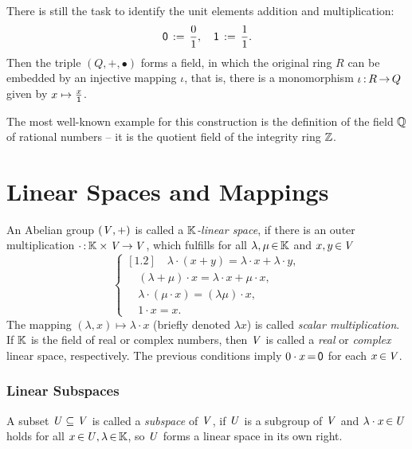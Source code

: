 \documentclass[11pt,twoside]{article}
\begin{document}
\subparagraph{}
There is still the task to identify the unit elements {\wrt}
addition and multiplication:
\[
{\mathsf{0}} \,:=\, \frac{0}{1},
\quad
{\mathsf{1}} \,:=\, \frac{1}{1}.
\]
Then the triple $(Q,+,\bullet)$ forms a field,
in which the original ring $R$ can be embedded by an injective mapping $\iota$,
that is,
there is a monomorphism $\iota {\,:\,} R {\,\to\,} Q$ given by $x \mapsto \frac{x}{{\mathsf{1}}}$.

\subparagraph{}
The most well-known example for this construction is the definition
of the field ${\mathbb{Q}}$ of rational numbers --
it is the quotient field of the integrity ring ${\mathbb{Z}}$.

\part{Linear Spaces and Mappings}                                              %
An Abelian group $(\mathit{V},+)$ is called a \textit{${\mathbb{K}}$-linear space},
if there is an outer multiplication $\cdot {\,:\,} {\mathbb{K}} \times \mathit{V} {\,\to\,} \mathit{V}$,
which fulfills for all $\lambda,\mu {\,\in\,} {\mathbb{K}}$ and $x,y {\,\in\,} \mathit{V}$
\[
\begin{cases}[1.2]
\quad \lambda \cdot (x + y)       = \lambda \cdot x + \lambda \cdot y,\\
\quad (\lambda + \mu) \cdot x     = \lambda \cdot x + \mu \cdot x,\\
\quad \lambda \cdot (\mu \cdot x) = (\lambda \mu) \cdot x,\\
\quad 1 \cdot x                   = x.
\end{cases}
\]
The mapping $(\lambda,x) \mapsto \lambda \cdot x$
(briefly denoted $\lambda x$)
is called \textit{scalar multiplication}.
If ${\mathbb{K}}$ is the field of real or complex numbers,
then $\mathit{V}$ is called a \textit{real} or \textit{complex} linear space,
respectively.
The previous conditions imply $0 \cdot x {\,=\,} {\mathsf{0}}$ for each $x {\,\in\,} \mathit{V}$.

\section{Linear Subspaces}
A subset $\mathit{U} \subseteq \mathit{V}$ is called a \textit{subspace} of $\mathit{V}$,
if $\mathit{U}$ is a subgroup of $\mathit{V}$ and
$\lambda \cdot x {\,\in\,} \mathit{U}$ holds for all $x {\,\in\,} \mathit{U}, \lambda {\,\in\,} {\mathbb{K}}$,
so $\mathit{U}$ forms a linear space in its own right.
\end{document}

